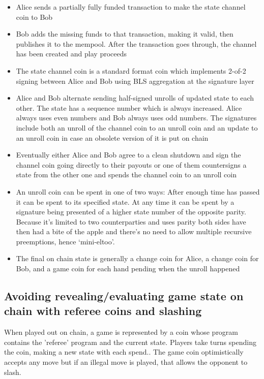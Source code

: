 \documentclass[a4paper]{article}
\begin{document}
\begin{multicols}{2}
\begin{itemize}
    \item Alice sends a partially fully funded transaction to make the state channel coin to Bob
    \item Bob adds the missing funds to that transaction, making it valid, then publishes it to the mempool. After the transaction goes through, the channel has been created and play proceeds
    \item The state channel coin is a standard format coin which implements 2-of-2 signing between Alice and Bob using BLS aggregation at the signature layer
    \item Alice and Bob alternate sending half-signed unrolls of updated state to each other. The state has a sequence number which is always increased. Alice always uses even numbers and Bob always uses odd numbers. The signatures include both an unroll of the channel coin to an unroll coin and an update to an unroll coin in case an obsolete version of it is put on chain
    \item Eventually either Alice and Bob agree to a clean shutdown and sign the channel coin going directly to their payouts or one of them countersigns a state from the other one and spends the channel coin to an unroll coin
    \item An unroll coin can be spent in one of two ways: After enough time has passed it can be spent to its specified state. At any time it can be spent by a signature being presented of a higher state number of the opposite parity. Because it’s limited to two counterparties and uses parity both sides have then had a bite of the apple and there’s no need to allow multiple recursive preemptions, hence ‘mini-eltoo’.
    \item The final on chain state is generally a change coin for Alice, a change coin for Bob, and a game coin for each hand pending when the unroll happened
\end{itemize}

\subsection{Avoiding revealing/evaluating game state on chain with referee coins and slashing}

When played out on chain, a game is represented by a coin whose program contains the 'referee' program and the current state.  Players take turns spending the coin, making a new state with each spend.. The game coin optimistically accepts any move but if an illegal move is played, that allows the opponent to slash.


\end{multicols}
\end{document}
